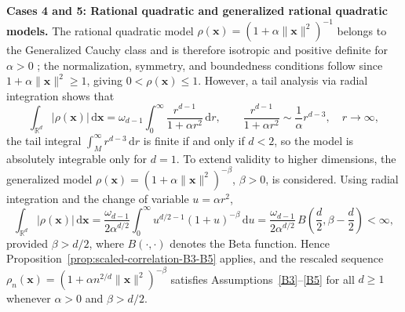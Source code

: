 \documentclass[12pt]{report} %
\newcommand{\bx}{\mathbf{x}}
\newcommand{\rd}{\mathrm{d}}
\begin{document}
\textbf{Cases 4 and 5: Rational quadratic and generalized rational quadratic models.} The rational quadratic model $\rho(\bx)=(1+\alpha\|\bx\|^2)^{-1}$ belongs to the Generalized Cauchy class and is therefore isotropic and positive definite for $\alpha>0$ \citep{Gneiting2013}; the normalization, symmetry, and boundedness conditions follow since $1+\alpha\|\bx\|^2\geq 1$, giving $0<\rho(\bx)\leq 1$. However, a tail analysis via radial integration shows that
\begin{equation*}
\int_{\mathbb{R}^d}|\rho(\bx)|\,\rd\bx = \omega_{d-1}\int_0^\infty\frac{r^{d-1}}{1+\alpha r^2}\,\rd r, \qquad \frac{r^{d-1}}{1+\alpha r^2}\sim\frac{1}{\alpha}r^{d-3}, \quad r\to\infty,
\end{equation*}
the tail integral $\int_M^\infty r^{d-3}\,\rd r$ is finite if and only if $d<2$, so the model is absolutely integrable only for $d=1$. To extend validity to higher dimensions, the generalized model $\rho(\bx)=\left(1+\alpha\|\bx\|^2\right)^{-\beta}$, $\beta>0$, is considered. Using radial integration and the change of variable $u=\alpha r^2$,
\begin{equation*}
\int_{\mathbb{R}^d}|\rho(\bx)|\,\rd\bx = \frac{\omega_{d-1}}{2\alpha^{d/2}}\int_0^\infty u^{d/2-1}(1+u)^{-\beta}\,\rd u = \frac{\omega_{d-1}}{2\alpha^{d/2}}\,B\!\left(\frac{d}{2},\beta-\frac{d}{2}\right)<\infty,
\end{equation*}
provided $\beta>d/2$, where $B(\cdot,\cdot)$ denotes the Beta function. Hence Proposition~\ref{prop:scaled-correlation-B3-B5} applies, and the rescaled sequence $\rho_n(\bx)=\left(1+\alpha n^{2/d}\|\bx\|^2\right)^{-\beta}$ satisfies Assumptions~\ref{B3}--\ref{B5} for all $d\geq 1$ whenever $\alpha>0$ and $\beta>d/2$.
\end{document}
